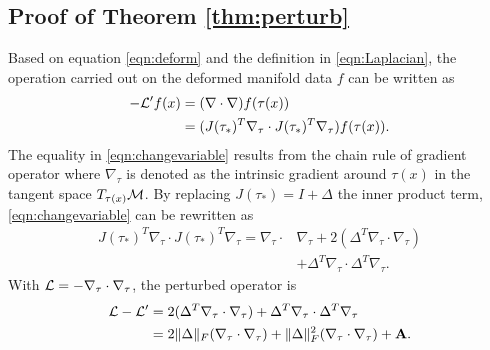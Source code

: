 \subsection{Proof of Theorem \ref{thm:perturb}}
 \label{app:perturb}
 Based on equation \eqref{eqn:deform} and the definition in \eqref{eqn:Laplacian}, the operation carried out on the deformed manifold data $f$ can be written as
\begin{align}
   - {\mathcal L}' f(x)&= (\nabla\cdot \nabla)  f(\tau(x))
   \\ \label{eqn:changevariable} &=   (J(\tau_*)^T \nabla_\tau \cdot J(\tau_*)^T \nabla_\tau)  f(\tau(x)).
\end{align}
The equality in \eqref{eqn:changevariable} results from the chain rule of gradient operator where $\nabla_\tau$ is denoted as the intrinsic gradient around $\tau(x)$ in the tangent space $T_{\tau(x)}{\mathcal M}$.
By replacing $J(\tau_*) = I + \Delta$ the inner product term,  \eqref{eqn:changevariable} can be rewritten as
\begin{align}
    \nonumber J(\tau_*)^T\nabla_\tau\cdot  J(\tau_*)^T \nabla_\tau  =  \nabla_\tau \cdot & \nabla_\tau  + 2(\Delta^T \nabla_\tau \cdot \nabla_\tau ) \\
    &+  \Delta^T\nabla_\tau \cdot \Delta^T\nabla_\tau.
\end{align}
With ${\mathcal L}=- \nabla_\tau \cdot \nabla_\tau$, the perturbed operator is
\begin{align}
   \label{eqn:E1} {\ensuremath{\mathcal L}}-{\mathcal L}'&= 2(\Delta^T \nabla_\tau \cdot \nabla_\tau )  + \Delta^T\nabla_\tau \cdot \Delta^T\nabla_\tau \\
   \label{eqn:E2} & = 2\|\Delta\|_F (\nabla_\tau \cdot \nabla_\tau) + \|\Delta\|_F^2 (\nabla_\tau \cdot \nabla_\tau)+{\mathbf A}.
\end{align}
